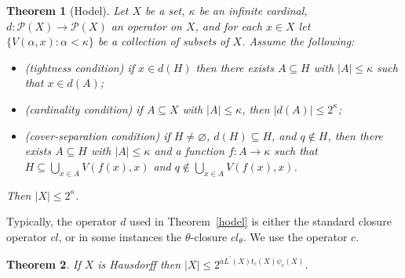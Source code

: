\documentclass[11pt]{amsart}
\newif\ifdraft\draftfalse
\newtheorem{theorem}{Theorem}[section]
\theoremstyle{definition}
\theoremstyle{remark}
\numberwithin{equation}{section}
\begin{document}
\begin{theorem}[Hodel]{{\immediate{}}{\ifdraft\hspace{-\lastskip}\vadjust{\vspace{-1mm}\smash{\llap{{\tt {{hodel}}}\hspace{8mm}}}\vspace{1mm}}\fi}}
Let $X$ be a set, $\kappa$ be an infinite cardinal, $d:{\ensuremath{\mathcal{{P}}}}(X)\to{\ensuremath{\mathcal{{P}}}}(X)$ an operator on $X$, and for each $x\in X$ let $\{V(\alpha,x):\alpha<\kappa\}$ be a collection of subsets of $X$. Assume the following:
\begin{itemize}
\item[(T)] (tightness condition) if $x\in d(H)$ then there exists $A{\subseteq} H$ with $|A|\leq\kappa$ such that $x\in d(A)$;
\item[(C)] (cardinality condition) if $A{\subseteq} X$ with $|A|\leq\kappa$, then $|d(A)|\leq 2^\kappa$;
\item[(C-S)] (cover-separation condition) if $H\neq{\varnothing}$, $d(H){\subseteq} H$, and $q\notin H$, then there exists $A{\subseteq} H$ with $|A|\leq\kappa$ and a function $f:A\to\kappa$ such that $H{\subseteq}{\bigcup}_{x\in A}V(f(x),x)$ and $q\notin{\bigcup}_{x\in A}V(f(x),x)$.
\end{itemize}
Then $|X|\leq 2^\kappa$.
\end{theorem}

Typically, the operator $d$ used in Theorem~\ref{hodel} is either the standard closure operator $cl$, or in some instances the $\theta$-closure $cl_\theta$. We use the operator $c$.

\begin{theorem}{{\immediate{}}{\ifdraft\hspace{-\lastskip}\vadjust{\vspace{-1mm}\smash{\llap{{\tt {{newbound}}}\hspace{8mm}}}\vspace{1mm}}\fi}}
If $X$ is Hausdorff then $|X|\leq 2^{aL^\prime(X)t_c(X)\psi_c(X)}$.
\end{theorem}
\end{document}
